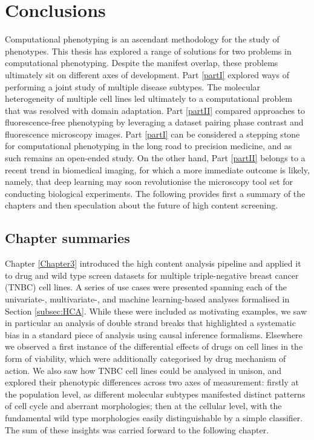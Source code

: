 
\chapter{Conclusions} %

\label{Chapter7} %

Computational phenotyping is an ascendant methodology for the study of phenotypes. This thesis has explored a range of solutions for two problems in computational phenotyping. Despite the manifest overlap, these problems ultimately sit on different axes of development. Part \ref{partI} explored ways of performing a joint study of multiple disease subtypes. The molecular heterogeneity of multiple cell lines led ultimately to a computational problem that was resolved with domain adaptation. Part \ref{partII} compared approaches to fluorescence-free phenotyping by leveraging a dataset pairing phase contrast and fluorescence microscopy images. Part \ref{partI} can be considered a stepping stone for computational phenotyping in the long road to precision medicine, and as such remains an open-ended study. On the other hand, Part \ref{partII} belongs to a recent trend in biomedical imaging, for which a more immediate outcome is likely, namely, that deep learning may soon revolutionise the microscopy tool set for conducting biological experiments. The following provides first a summary of the chapters and then speculation about the future of high content screening.

\section{Chapter summaries}

Chapter \ref{Chapter3} introduced the high content analysis pipeline and applied it to drug and wild type screen datasets for multiple triple-negative breast cancer (TNBC) cell lines. A series of use cases were presented spanning each of the univariate-, multivariate-, and machine learning-based analyses formalised in Section \ref{subsec:HCA}. While these were included as motivating examples, we saw in particular an analysis of double strand breaks that highlighted a systematic bias in a standard piece of analysis using causal inference formalisms. Elsewhere we observed a first instance of the differential effects of drugs on cell lines in the form of viability, which were additionally categorised by drug mechanism of action. We also saw how TNBC cell lines could be analysed in unison, and explored their phenotypic differences across two axes of measurement: firstly at the population level, as different molecular subtypes manifested distinct patterns of cell cycle and aberrant morphologies; then at the cellular level, with the fundamental wild type morphologies easily distinguishable by a simple classifier. The sum of these insights was carried forward to the following chapter.

